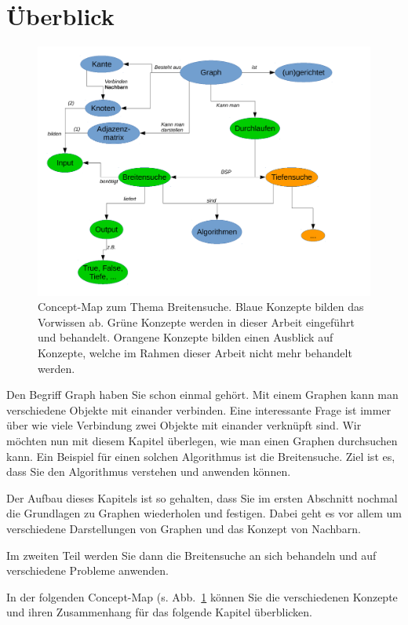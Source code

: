 \section*{Überblick}

\begin{figure}[htb]
\begin{center}
\includegraphics[width=.99\textwidth]{../cmap/bsuche_cmap.pdf}
\caption{Concept-Map zum Thema Breitensuche.
Blaue Konzepte bilden das Vorwissen ab. 
Grüne Konzepte werden in dieser Arbeit eingeführt und behandelt. 
Orangene Konzepte bilden einen Ausblick auf Konzepte, welche im Rahmen dieser Arbeit nicht mehr behandelt werden. 
}
\label{fig:cmap2}
\end{center}
\end{figure}


Den Begriff Graph haben Sie schon einmal gehört. Mit einem Graphen kann man verschiedene Objekte mit einander verbinden. 
Eine interessante Frage ist immer über wie viele Verbindung zwei Objekte mit einander verknüpft sind. 
Wir möchten nun mit diesem Kapitel überlegen, wie man einen Graphen durchsuchen kann.
Ein Beispiel für einen solchen Algorithmus ist die Breitensuche. 
Ziel ist es, dass Sie den Algorithmus verstehen und anwenden können. 

Der Aufbau dieses Kapitels ist so gehalten, dass Sie im ersten Abschnitt nochmal die Grundlagen zu Graphen wiederholen und festigen. 
Dabei geht es vor allem um verschiedene Darstellungen von Graphen und das Konzept von Nachbarn.


Im zweiten Teil werden Sie dann die Breitensuche an sich behandeln und auf verschiedene Probleme anwenden.

In der folgenden Concept-Map (s. Abb.~\ref{fig:cmap2} können Sie die verschiedenen Konzepte und ihren Zusammenhang für das folgende Kapitel überblicken.

